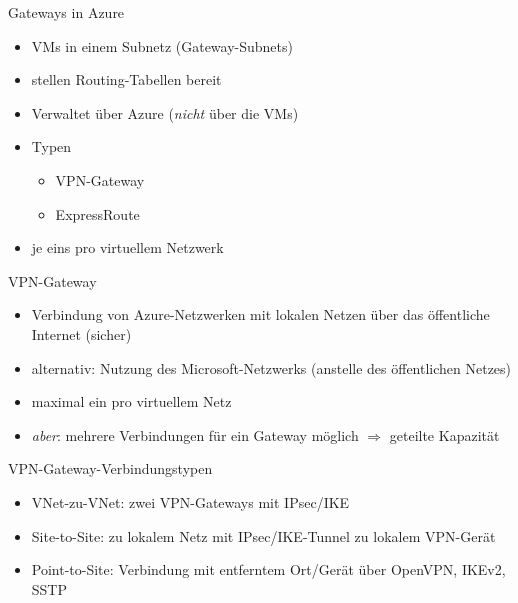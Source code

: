 
\begin{flashcard}[]{Gateways in Azure}
  \begin{itemize}
    \item VMs in einem Subnetz (Gateway-Subnets)
    \item stellen Routing-Tabellen bereit
    \item Verwaltet über Azure (\emph{nicht} über die VMs)
    \item Typen
      \begin{itemize}
        \item VPN-Gateway
        \item ExpressRoute
      \end{itemize}
    \item je eins pro virtuellem Netzwerk
  \end{itemize}
\end{flashcard}

\begin{flashcard}[]{VPN-Gateway}
  \begin{itemize}
    \item Verbindung von Azure-Netzwerken mit lokalen Netzen über das öffentliche Internet (sicher)
    \item alternativ: Nutzung des Microsoft-Netzwerks (anstelle des öffentlichen Netzes)
    \item maximal ein pro virtuellem Netz
    \item \emph{aber}: mehrere Verbindungen für ein Gateway möglich\newline
      $\Rightarrow$ geteilte Kapazität
  \end{itemize}
\end{flashcard}

\begin{flashcard}[]{VPN-Gateway-Verbindungstypen}
  \begin{itemize}
    \item VNet-zu-VNet: zwei VPN-Gateways mit IPsec/IKE
    \item Site-to-Site: zu lokalem Netz mit IPsec/IKE-Tunnel zu lokalem VPN-Gerät
    \item Point-to-Site: Verbindung mit entferntem Ort/Gerät über OpenVPN, IKEv2, SSTP
  \end{itemize}
\end{flashcard}

